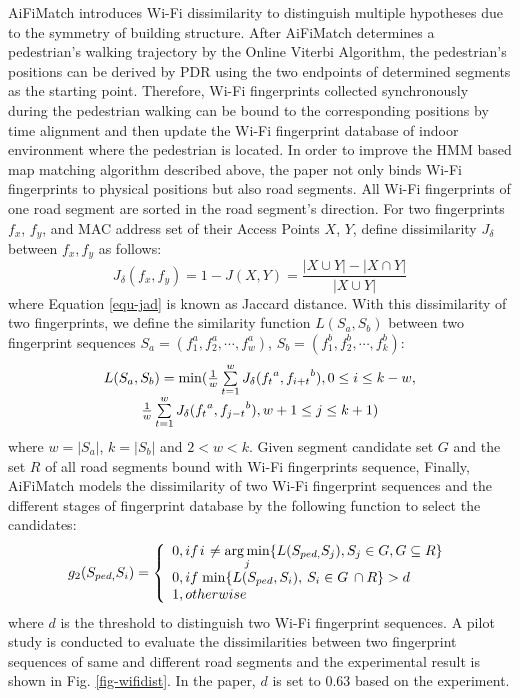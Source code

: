 \documentclass[conference]{IEEEtran}
\begin{document}
AiFiMatch introduces Wi-Fi dissimilarity to distinguish multiple hypotheses due to the symmetry of building structure. After AiFiMatch determines a pedestrian's walking trajectory by the Online Viterbi Algorithm, the pedestrian's positions can be derived by PDR using the two endpoints of determined segments as the starting point. Therefore, Wi-Fi fingerprints collected synchronously during the pedestrian walking can be bound to the corresponding positions by time alignment and then update the Wi-Fi fingerprint database of indoor environment where the pedestrian is located. In order to improve the HMM based map matching algorithm described above, the paper not only binds Wi-Fi fingerprints to physical positions but also road segments. All Wi-Fi fingerprints of one road segment are sorted in the road segment's direction. For two fingerprints $f_x$, $f_y$, and MAC address set of their Access Points $X$, $Y$, define dissimilarity $J_{\delta}$ between $f_x,f_y$ as follows:
\begin{equation}
{J_\delta }(f_x,f_y) = 1 - J(X,Y) = \frac{{|X \cup Y| - |X \cap Y|}}{{|X \cup Y|}}
\label{equ-jad}
\end{equation}
where Equation \ref{equ-jad} is known as Jaccard distance. With this dissimilarity of two fingerprints, we define the similarity function $L(S_a, S_b)$ between two fingerprint sequences $S_a = (f_1^a,f_2^a,\cdots,f_w^a)$, $S_b = (f_1^b, f_2^b, \cdots, f_k^b)$:
\begin{equation}
\begin{array}{c}
L({S_a},{\rm{ }}{S_b}) = \min (\frac{1}{w}\sum\limits_{t = 1}^w {{J_\delta }({f_t}^a,{f_{i + t}}^b),0 \le i \le k - w,} \\
\frac{1}{w}\sum\limits_{t = 1}^w {{J_\delta }({f_t}^a,{f_{j - t}}^b),w + 1 \le j \le k + 1} )
\end{array}
\end{equation}
where $w=|S_a|$, $k=|S_b|$ and $2<w<k$. Given segment candidate set $G$ and the set $R$ of all road segments bound with Wi-Fi fingerprints sequence, Finally, AiFiMatch models the dissimilarity of two Wi-Fi fingerprint sequences and the different stages of fingerprint database by the following function to select the candidates: 
\begin{equation}
{g_2}({S_{ped,}}{S_i}) = \left\{ {\begin{array}{*{20}{l}}
	{0,if{\kern 1pt} i{\kern 1pt}  \ne \mathop {\arg \min }\limits_j \{ L({S_{ped,}}{S_j}),{S_j} \in G,G \subseteq R\} }\\
	{0,if{\kern 1pt} \min \{ L({S_{ped}},{S_i}),{\kern 1pt} {\kern 1pt} {S_i} \in G{\kern 1pt} {\kern 1pt}  \cap R\}  > d{\kern 1pt} {\kern 1pt} }\\
	{1,otherwise}
	\end{array}} \right.
\end{equation}
where $d$ is the threshold to distinguish two Wi-Fi fingerprint sequences. A pilot study is conducted to evaluate the dissimilarities between two fingerprint sequences of same and different road segments and the experimental result is shown in Fig. \ref{fig-wifidist}. In the paper, $d$ is set to $0.63$ based on the experiment. 
\end{document}
